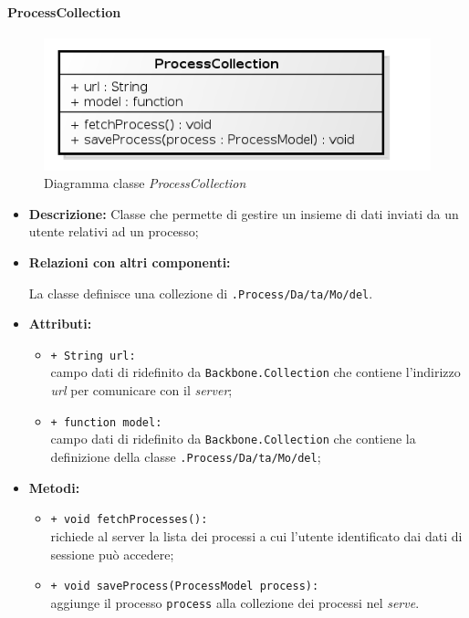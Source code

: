 \paragraph{ProcessCollection}
\label{processCollection}

\begin{figure}[H] \centering \includegraphics[width=%
\textwidth]
{./classi/client/model/ProcessCollection.png} \caption{Diagramma classe  \textit{ProcessCollection}}
\end{figure}

\begin{flushleft}
\begin{itemize}
\item \textbf{Descrizione:} Classe che permette di gestire un insieme di dati inviati da un utente relativi ad un processo;
\item \textbf{Relazioni con altri componenti:}
\begin{sloppypar}
La classe definisce una collezione di \texttt{\model{}.Process\fshyp{}Da\fshyp{}ta\fshyp{}Mo\fshyp{}del}.
\end{sloppypar}
\item \textbf{Attributi:}
\begin{sloppypar}
\begin{itemize}
\item \texttt{+ String url:}\\ campo dati di ridefinito da \texttt{Backbone.Collection} che contiene l'indirizzo \textit{url} per comunicare con il \textit{server};
\item \texttt{+ function model:}\\ campo dati di ridefinito da \texttt{Backbone.Collection} che contiene la definizione della classe \texttt{\model{}.Process\fshyp{}Da\fshyp{}ta\fshyp{}Mo\fshyp{}del};
\end{itemize}
\end{sloppypar}
\item \textbf{Metodi:}
\begin{sloppypar}
\begin{itemize}
\item \texttt{+ void fetchProcesses():}\\ richiede al server la lista dei processi a cui l'utente identificato dai dati di sessione può accedere;
\item \texttt{+ void saveProcess(ProcessModel process):}\\ aggiunge il processo \texttt{process} alla collezione dei processi nel \textit{serve}.
\end{itemize}
\end{sloppypar}
\end{itemize}
\end{flushleft}

